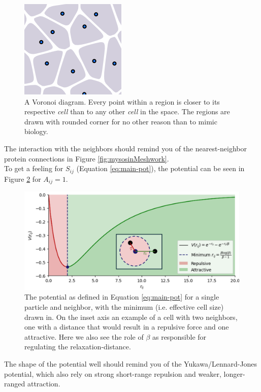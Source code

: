 \begin{figure}
    \centering
    \includegraphics[width=0.3\linewidth]{chapters//Theory//figures/voronoi_explanation.png}
    \caption{A Voronoi diagram. Every point within a region is closer to its respective \textit{cell} than to any other \textit{cell} in the space. The regions are drawn with rounded corner for no other reason than to mimic biology.}
    \label{fig:voronoi-explanation}
\end{figure}
The interaction with the neighbors should remind you of the nearest-neighbor protein connections in Figure \ref{fig:mysosinMeshwork}. 
\\

To get a feeling for $S_{ij}$ (Equation \ref{eq:main-pot}), the potential can be seen in Figure \ref{fig:potential} for $A_{ij}=1$.
\begin{figure}[H]
    \centering
    \includegraphics[width=1.\linewidth]{chapters/Theory/figures/potential_annotated.png}
    \caption{The potential as defined in Equation \ref{eq:main-pot} for a single particle and neighbor, with the minimum (i.e. effective cell size) drawn in. On the inset axis an example of a cell with two neighbors, one with a distance that would result in a repulsive force and one attractive. Here we also see the role of $\beta$ as responsible for regulating the relaxation-distance.}
    \label{fig:potential}
\end{figure}

The shape of the potential well should remind you of the Yukawa/Lennard-Jones potential, which also rely on strong short-range repulsion and weaker, longer-ranged attraction.\\

